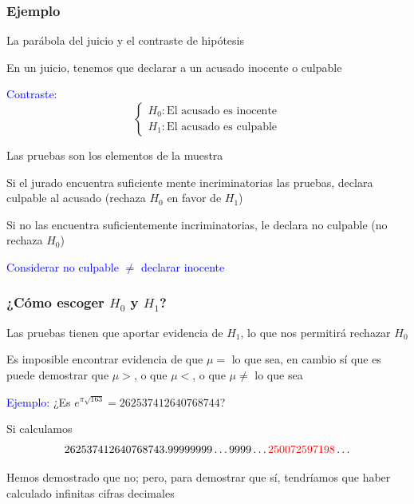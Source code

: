 \documentclass[12pt,t]{beamer}\usepackage[]{graphicx}\usepackage[]{color}
\newcommand{\red}[1]{\textcolor{red}{#1}}
\newcommand{\blue}[1]{\textcolor{blue}{#1}}
\renewcommand{\emph}[1]{{\color{red}#1}}
\theoremstyle{plain}
\theoremstyle{definition}
\begin{document}
\begin{frame}
\frametitle{Ejemplo}

\emph{La parábola del juicio y el contraste de hipótesis}

En un juicio, tenemos que  declarar a un acusado inocente o culpable
\medskip

\blue{Contraste:}
$$
\left\{\begin{array}{ll} 
H_{0}:\mbox{El acusado es inocente}\\ 
H_{1}:\mbox{El acusado es culpable}
\end{array}
\right.
$$

Las pruebas son los elementos de la muestra
\medskip

Si el jurado  encuentra suficiente mente incriminatorias las pruebas, declara \emph{culpable}  al acusado (rechaza $H_0$ en favor de $H_1$)
\medskip

Si no las encuentra suficientemente  incriminatorias, le declara \emph{no culpable} (no rechaza $H_{0}$)
\medskip

\blue{Considerar no culpable $\neq$ declarar inocente}

\end{frame}


\begin{frame}
\frametitle{¿Cómo escoger $H_0$ y $H_1$?}

Las pruebas tienen que aportar evidencia de $H_1$, lo que nos permitirá rechazar $H_0$
\bigskip

Es imposible encontrar evidencia de que $\mu=$ lo que sea, en cambio sí que es puede demostrar que $\mu>$, o que $\mu<$, o que $\mu\neq$ lo que sea
\medskip

\blue{Ejemplo:} ¿Es $e^{\pi\sqrt{163}}=262537412640768744$? 

Si  calculamos
$$
262537412640768743.99999999\ldots9999\ldots\red{250072597198}\ldots
$$

Hemos demostrado que no; pero, para demostrar  que sí, tendríamos que haber calculado infinitas cifras decimales
\end{frame}
\end{document}
